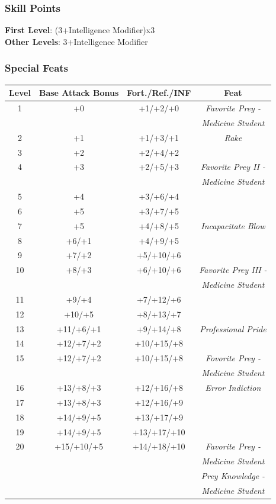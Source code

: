 \documentclass[ letterpaper,12pt]{article}
\begin{document}
\subsubsection{Skill Points}
{\bf First Level}: (3+Intelligence Modifier)x3\\
{\bf Other Levels}: 3+Intelligence Modifier\\

\subsubsection{Special Feats}

\begin{center} \begin{tabular}{|c||c|c|c|}
\hline
{\bf Level}&{\bf Base Attack Bonus}&{\bf Fort./Ref./INF}&{\bf Feat}\\
\hline
1&+0&+1/+2/+0&{\it Favorite Prey -}\\
&&&{\it Medicine Student}\\
\hline
2&+1&+1/+3/+1&{\it Rake}\\
\hline
3&+2&+2/+4/+2&\\
\hline
4&+3&+2/+5/+3&{\it Favorite Prey II -}\\
&&&{\it Medicine Student}\\
\hline
5&+4&+3/+6/+4&\\
\hline
6&+5&+3/+7/+5&\\
\hline
7&+5&+4/+8/+5&{\it Incapacitate Blow}\\
\hline
8&+6/+1&+4/+9/+5&\\
\hline
9&+7/+2&+5/+10/+6&\\
\hline
10&+8/+3&+6/+10/+6&{\it Favorite Prey III -}\\
&&&{\it Medicine Student}\\
\hline
11&+9/+4&+7/+12/+6&\\
\hline
12&+10/+5&+8/+13/+7&\\
\hline
13&+11/+6/+1&+9/+14/+8&{\it Professional Pride}\\
\hline
14&+12/+7/+2&+10/+15/+8&\\
\hline
15&+12/+7/+2&+10/+15/+8&{\it Fovorite Prey -}\\
&&&{\it Medicine Student}\\
\hline
16&+13/+8/+3&+12/+16/+8&{\it Error Indiction}\\
\hline
17&+13/+8/+3&+12/+16/+9&\\
\hline
18&+14/+9/+5&+13/+17/+9&\\
\hline
19&+14/+9/+5&+13/+17/+10&\\
\hline
20&+15/+10/+5&+14/+18/+10&{\it Favorite Prey -}\\
&&&{\it Medicine Student}\\
&&&{\it Prey Knowledge - }\\
&&&{\it Medicine Student}\\
\hline
\end{tabular} \end{center}
\end{document}
